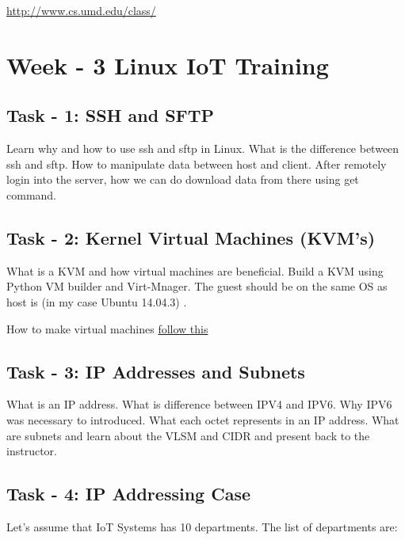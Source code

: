 \documentclass[letterpaper,10pt,english]{sphinxmanual}
\begin{document}
\href{http://www.cs.umd.edu/class/}{http://www.cs.umd.edu/class/}


\chapter{Week - 3 Linux IoT Training}
\label{week-03:week-3-linux-iot-training}\label{week-03::doc}\label{week-03:week-03}

\section{Task - 1: SSH and SFTP}
\label{week-03:task-1-ssh-and-sftp}
Learn why and how to use ssh and sftp in Linux. What is the difference between ssh and sftp. How to manipulate data between host and client. After remotely login into the server, how we can do download data from there using get command.


\section{Task - 2: Kernel Virtual Machines (KVM's)}
\label{week-03:task-2-kernel-virtual-machines-kvm-s}
What is a KVM and how virtual machines are beneficial. Build a KVM using Python VM builder and Virt-Mnager. The guest should be on the same OS as host is (in my case Ubuntu 14.04.3) .

How to make virtual machines \href{https://www.howtoforge.com/creating-virtual-machines-for-xen-kvm-vmware-workstation-6-vmware-server-with-vmbuilder-on-ubuntu-8.10-p2}{follow this}


\section{Task - 3: IP Addresses and Subnets}
\label{week-03:task-3-ip-addresses-and-subnets}
What is an IP address. What is difference between IPV4 and IPV6. Why IPV6 was necessary to introduced. What each octet represents in an IP address. What are subnets and learn about the VLSM and CIDR and present back to the instructor.


\section{Task - 4: IP Addressing Case}
\label{week-03:task-4-ip-addressing-case}
Let's assume that IoT Systems has 10 departments. The list of departments are:
\end{document}
